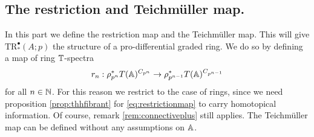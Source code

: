 \subsection{The restriction and Teichm\"uller map.}
In this part we define the restriction map
 and the Teichm\"uller map.
This will give $\mathrm{TR}^\bullet_\ast(A;p)$ the structure of a pro-differential graded ring.
We do so by defining a map of ring $\mathbb{T}$-spectra
\begin{equation}\label{eq:restrictionmap}
r_n:\rho_{p^n}^\ast T(\mathbb{A})^{C_{p^n}}\to \rho_{p^{n-1}}^\ast T(\mathbb{A})^{C_{p^{n-1}}}
\end{equation}
for all $n\in \mathbb{N}$. For this reason we restrict to the case of rings,
since we need proposition \ref{prop:thhfibrant} for \eqref{eq:restrictionmap} 
to carry homotopical information. Of course, remark \ref{rem:connectiveplus}
still applies. The Teichm\"uller map can be defined without any assumptions
on $\mathbb{A}$.

